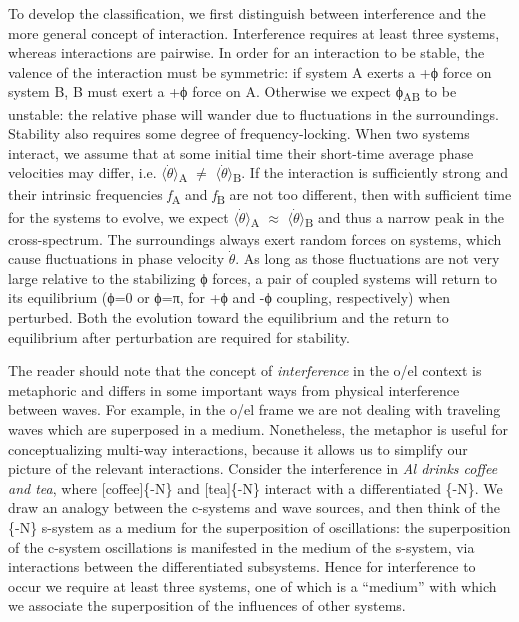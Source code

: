   To develop the classification, we first distinguish between interference and the more general concept of interaction. Interference requires at least three systems, whereas interactions are pairwise. In order for an interaction to be stable, the valence of the interaction must be symmetric: if system A exerts a +ϕ force on system B, B must exert a +ϕ force on A. Otherwise we expect ϕ\textsubscript{AB} to be unstable: the relative phase will wander due to fluctuations in the surroundings. Stability also requires some degree of frequency-locking. When two systems interact, we assume that at some initial time their short-time average phase velocities may differ, i.e. $\langle\dot{\theta}\rangle$\textsubscript{A} ${\neq}$ $\langle\dot{\theta}\rangle$\textsubscript{B}. If the interaction is sufficiently strong and their intrinsic frequencies \textit{f}\textsubscript{A} and \textit{f}\textsubscript{B} are not too different, then with sufficient time for the systems to evolve, we expect $\langle\dot{\theta}\rangle$\textsubscript{A} ${\approx}$ $\langle\dot{\theta}\rangle$\textsubscript{B} and thus a narrow peak in the cross-spectrum. The surroundings always exert random forces on systems, which cause fluctuations in phase velocity $\dot{\theta}$. As long as those fluctuations are not very large relative to the stabilizing ϕ forces, a pair of coupled systems will return to its equilibrium (ϕ=0 or ϕ=π, for +ϕ and -ϕ coupling, respectively) when perturbed. Both the evolution toward the equilibrium and the return to equilibrium after perturbation are required for stability.

  The reader should note that the concept of \textit{interference} in the o/el context is metaphoric and differs in some important ways from physical interference between waves. For example, in the o/el frame we are not dealing with traveling waves which are superposed in a medium. Nonetheless, the metaphor is useful for conceptualizing multi-way interactions, because it allows us to simplify our picture of the relevant interactions. Consider the interference in \textit{Al drinks coffee and tea}, where [coffee]\{-N\} and [tea]\{-N\} interact with a differentiated \{-N\}. We draw an analogy between the c-systems and wave sources, and then think of the \{-N\} s-system as a medium for the superposition of oscillations: the superposition of the c-system oscillations is manifested in the medium of the s-system, via interactions between the differentiated subsystems. Hence for interference to occur we require at least three systems, one of which is a “medium” with which we associate the superposition of the influences of other systems. 

